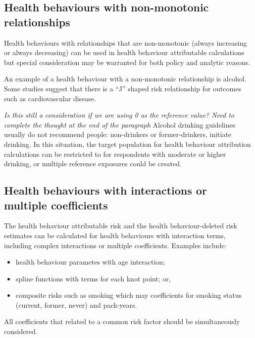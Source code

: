 \documentclass[]{book}
\providecommand{\tightlist}{%
  \setlength{\itemsep}{0pt}\setlength{\parskip}{0pt}}
\begin{document}
\subsection{Health behaviours with non-monotonic
relationships}\label{health-behaviours-with-non-monotonic-relationships}

Health behaviours with relationships that are non-monotonic (always
increasing or always decreasing) can be used in health behaviour
attributable calculations but special consideration may be warranted for
both policy and analytic reasons.

An example of a health behaviour with a non-monotonic relationship is
alcohol. Some studies suggest that there is a ``J'' shaped risk
relationship for outcomes such as cardiovascular disease.

\emph{Is this still a consideration if we are using 0 as the reference
value?} \emph{Need to complete the thought at the end of the paragraph}
Alcohol drinking guidelines usually do not recommend people:
non-drinkers or former-drinkers, initiate drinking. In this situation,
the target population for health behaviour attribution calculations can
be restricted to for respondents with moderate or higher drinking, or
multiple reference exposures could be created.

\subsection{Health behaviours with interactions or multiple
coefficients}\label{health-behaviours-with-interactions-or-multiple-coefficients}

The health behaviour attributable risk and the health behaviour-deleted
risk estimates can be calculated for health behaviours with interaction
terms, including complex interactions or multiple coefficients. Examples
include:

\begin{itemize}
\tightlist
\item
  health behaviour parametes with age interaction;
\item
  spline functions with terms for each knot point; or,
\item
  composite risks such as smoking which may coefficients for smoking
  status (current, former, never) and pack-years.
\end{itemize}

All coefficients that related to a common risk factor should be
simultaneously considered.
\end{document}
